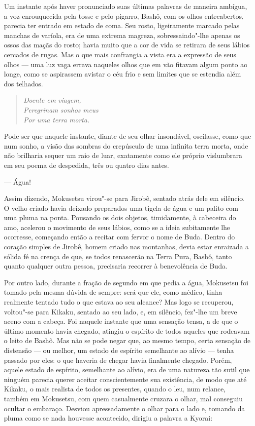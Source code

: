 Um instante após haver pronunciado suas últimas palavras de maneira
ambígua, a voz enrouquecida pela tosse e pelo pigarro, Bashô, com os
olhos entreabertos, parecia ter entrado em estado de coma. Seu rosto,
ligeiramente marcado pelas manchas de varíola, era de uma extrema
magreza, sobressaindo"-lhe apenas os ossos das maçãs do rosto; havia
muito que a cor de vida se retirara de seus lábios cercados de rugas.
Mas o que mais confrangia a vista era a expressão de seus olhos --- uma
luz vaga errava naqueles olhos que em vão fitavam algum ponto ao longe,
como se aspirassem avistar o céu frio e sem limites que se estendia
além dos telhados.

\bigskip
\begin{verse}
\textit{Doente em viagem,\\
Peregrinam sonhos meus\\
Por uma terra morta.}
\end{verse}

Pode ser que naquele instante, diante de seu olhar insondável,
oscilasse, como que num sonho, a visão das sombras do crepúsculo de uma
infinita terra morta, onde não brilharia sequer um raio de luar,
exatamente como ele próprio vislumbrara em seu poema de despedida, três
ou quatro dias antes.

--- Água!

Assim dizendo, Mokusetsu virou"-se para Jirobê, sentado atrás dele em
silêncio. O velho criado havia deixado preparados uma tigela de água e
um palito com uma pluma na ponta. Pousando os dois objetos,
timidamente, à cabeceira do amo, acelerou o movimento de seus lábios,
como se a ideia subitamente lhe ocorresse, começando então a recitar
com fervor o nome de Buda. Dentro do coração simples de Jirobê, homem
criado nas montanhas, devia estar enraizada a sólida fé na crença de
que, se todos renascerão na Terra Pura, Bashô, tanto quanto qualquer
outra pessoa, precisaria recorrer à benevolência de Buda.

Por outro lado, durante a fração de segundo em que pedia a água,
Mokusetsu foi tomado pela mesma dúvida de sempre: será que ele, como
médico, tinha realmente tentado tudo o que estava ao seu alcance? Mas
logo se recuperou, voltou"-se para Kikaku, sentado ao seu lado, e, em
silêncio, fez"-lhe um breve aceno com a cabeça. Foi naquele instante que
uma sensação tensa, a de que o último momento havia chegado, atingiu o
espírito de todos aqueles que rodeavam o leito de Bashô. Mas não se
pode negar que, ao mesmo tempo, certa sensação de distensão --- ou
melhor, um estado de espírito semelhante ao alívio --- tenha passado por
eles: o que haveria de chegar havia finalmente chegado. Porém, aquele
estado de espírito, semelhante ao alívio, era de uma natureza tão sutil
que ninguém parecia querer aceitar conscientemente sua existência, de
modo que até Kikaku, o mais realista de todos os presentes, quando o
leu, num relance, também em Mokusetsu, com quem casualmente cruzara o
olhar, mal conseguiu ocultar o embaraço. Desviou apressadamente o olhar
para o lado e, tomando da pluma como se nada houvesse acontecido,
dirigiu a palavra a Kyorai:

